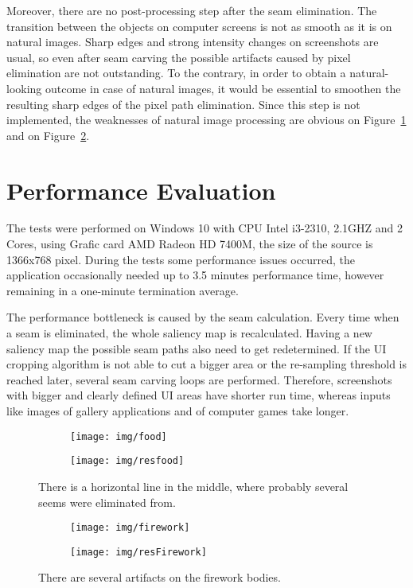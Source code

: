 \documentclass[draft,final]{vutinfth} %
\begin{document}
	Moreover, there are no post-processing step after the seam elimination.
	The transition between the objects on computer screens is not as smooth as it is on natural images.
	Sharp edges and strong intensity changes on screenshots are usual, so even after seam carving the possible artifacts caused by pixel elimination are not outstanding. 
	To the contrary, in order to obtain a natural-looking outcome in case of natural images, it would be essential to smoothen the resulting sharp edges of the pixel path elimination. 
	Since this step is not implemented, the weaknesses of natural image processing are obvious on Figure~\ref{fig:nat:food} and on Figure~\ref{fig:nat:fire}.  
	
	
	\section{Performance Evaluation}
	The tests were performed on Windows 10 with CPU Intel i3-2310, 2.1GHZ and 2 Cores, using Grafic card AMD Radeon HD 7400M, the size of the source is 1366x768 pixel.
	During the tests some performance issues occurred, the application occasionally needed up to 3.5 minutes performance time, however remaining in a one-minute termination average.\par 
	The performance bottleneck is caused by the seam calculation.
	Every time when a seam is eliminated, the whole saliency map is recalculated.
	Having a new saliency map the possible seam paths also need to get redetermined.
	If the UI cropping algorithm is not able to cut a bigger area or the re-sampling threshold is reached later, several seam carving loops are performed. 
	Therefore, screenshots with bigger and clearly defined UI areas have shorter run time, whereas inputs like images of gallery applications and of computer games take longer. 
	\begin{figure}[H]
		\centering
		\begin{subfigure}[b]{0.45\columnwidth}
			\centering
			\texttt{[image: img/food]}
		\end{subfigure}
		\begin{subfigure}[b]{0.45\columnwidth}
			\centering
			\texttt{[image: img/resfood]}
		\end{subfigure}
		\caption{There is a horizontal line in the middle, where probably several seems were eliminated from.}
		\label{fig:nat:food}
	\end{figure}  
	\begin{figure}[H]
		\centering
		\begin{subfigure}[b]{0.45\columnwidth}
			\centering
			\texttt{[image: img/firework]}
		\end{subfigure}
		\begin{subfigure}[b]{0.45\columnwidth}
			\centering
			\texttt{[image: img/resFirework]}
		\end{subfigure}
		\caption{There are several artifacts on the firework bodies.}
		\label{fig:nat:fire}
	\end{figure}    
	
\end{document}
